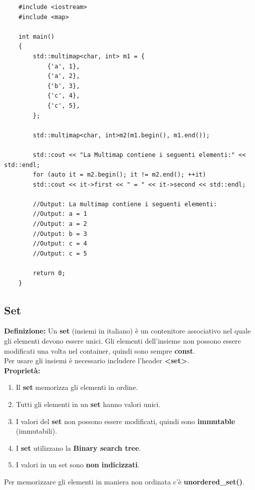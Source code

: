 \begin{lstlisting}
	#include <iostream>
	#include <map>
	
	int main()
	{
		std::multimap<char, int> m1 = {
			{'a', 1},
			{'a', 2},
			{'b', 3},
			{'c', 4},
			{'c', 5},
		};
		
		std::multimap<char, int>m2(m1.begin(), m1.end());
		
		std::cout << "La Multimap contiene i seguenti elementi:" << std::endl;
		for (auto it = m2.begin(); it != m2.end(); ++it)
		std::cout << it->first << " = " << it->second << std::endl;
		
		//Output: La multimap contiene i seguenti elementi: 
		//Output: a = 1
		//Output: a = 2
		//Output: b = 3
		//Output: c = 4
		//Output: c = 5
		
		return 0;
	}
\end{lstlisting}

\subsection{Set}

\textsf{\small \textbf{Definizione: } Un \textbf{set} (insiemi in italiano) è un contenitore associativo nel quale gli elementi devono essere unici. Gli elementi dell'insieme non possono essere modificati una volta nel container, quindi sono sempre \textbf{const}.} \\

\textsf{\small Per usare gli insiemi è necessario includere l'header \textbf{<set>}.} \\

\textbf{Proprietà: }

\begin{enumerate}
	\item \textsf{\small Il \textbf{set} memorizza gli elementi in ordine.}
	\item \textsf{\small Tutti gli elementi in un \textbf{set} hanno valori unici.}
	\item \textsf{\small I valori del \textbf{set} non possono essere modificati, quindi sono \textbf{immutable} (immutabili).}
	\item \textsf{\small I \textbf{set} utilizzano la \textbf{Binary search tree}.}
	\item \textsf{\small I valori in un set sono \textbf{non indicizzati}.}
\end{enumerate}

\textsf{\small Per memorizzare gli elementi in maniera non ordinata c'è \textbf{unordered\_set()}.} \\


